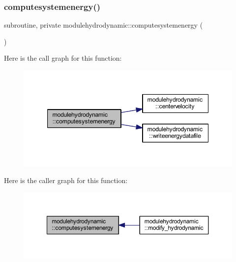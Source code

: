 \subsubsection{\texorpdfstring{computesystemenergy()}{computesystemenergy()}}
{\footnotesize\ttfamily subroutine, private modulehydrodynamic\+::computesystemenergy (\begin{DoxyParamCaption}{ }\end{DoxyParamCaption})\hspace{0.3cm}{\ttfamily [private]}}

Here is the call graph for this function\+:\nopagebreak
\begin{figure}[H]
\begin{center}
\leavevmode
\includegraphics[width=347pt]{namespacemodulehydrodynamic_a5267d6e9c0f3efab032ca1f82881b5dd_cgraph}
\end{center}
\end{figure}
Here is the caller graph for this function\+:\nopagebreak
\begin{figure}[H]
\begin{center}
\leavevmode
\includegraphics[width=350pt]{namespacemodulehydrodynamic_a5267d6e9c0f3efab032ca1f82881b5dd_icgraph}
\end{center}
\end{figure}
\mbox{\label{namespacemodulehydrodynamic_a71f29b5c93f202c8e783ecb892b1b497}} 
